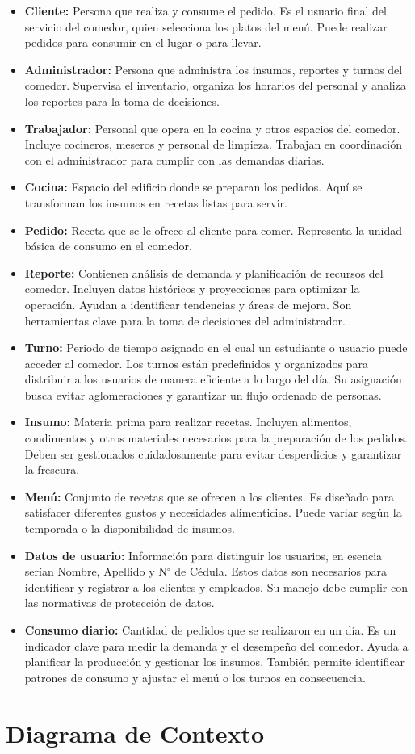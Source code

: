 \documentclass[12pt]{article}
\begin{document}
\begin{itemize}
	\item \textbf{Cliente:} Persona que realiza y consume el pedido. Es el usuario final del servicio del comedor, quien selecciona los platos del menú. Puede realizar pedidos para consumir en el lugar o para llevar.
	\item \textbf{Administrador:} Persona que administra los insumos, reportes y turnos del comedor. Supervisa el inventario, organiza los horarios del personal y analiza los reportes para la toma de decisiones.
	\item \textbf{Trabajador:} Personal que opera en la cocina y otros espacios del comedor. Incluye cocineros, meseros y personal de limpieza. Trabajan en coordinación con el administrador para cumplir con las demandas diarias.
	\item \textbf{Cocina:} Espacio del edificio donde se preparan los pedidos. Aquí se transforman los insumos en recetas listas para servir.
	\item \textbf{Pedido:} Receta que se le ofrece al cliente para comer. Representa la unidad básica de consumo en el comedor.
	\item \textbf{Reporte:} Contienen análisis de demanda y planificación de recursos del comedor. Incluyen datos históricos y proyecciones para optimizar la operación. Ayudan a identificar tendencias y áreas de mejora. Son herramientas clave para la toma de decisiones del administrador.
    \item \textbf{Turno:} Periodo de tiempo asignado en el cual un estudiante o usuario puede acceder al comedor. Los turnos están predefinidos y organizados para distribuir a los usuarios de manera eficiente a lo largo del día. Su asignación busca evitar aglomeraciones y garantizar un flujo ordenado de personas.
	\item \textbf{Insumo:} Materia prima para realizar recetas. Incluyen alimentos, condimentos y otros materiales necesarios para la preparación de los pedidos. Deben ser gestionados cuidadosamente para evitar desperdicios y garantizar la frescura.
	\item \textbf{Menú:} Conjunto de recetas que se ofrecen a los clientes. Es diseñado para satisfacer diferentes gustos y necesidades alimenticias. Puede variar según la temporada o la disponibilidad de insumos.
	\item \textbf{Datos de usuario:} Información para distinguir los usuarios, en esencia serían Nombre, Apellido y N$^{\circ}$ de Cédula. Estos datos son necesarios para identificar y registrar a los clientes y empleados. Su manejo debe cumplir con las normativas de protección de datos.
	\item \textbf{Consumo diario:} Cantidad de pedidos que se realizaron en un día. Es un indicador clave para medir la demanda y el desempeño del comedor. Ayuda a planificar la producción y gestionar los insumos. También permite identificar patrones de consumo y ajustar el menú o los turnos en consecuencia.
\end{itemize}

\pagebreak

\section{Diagrama de Contexto}
\end{document}
